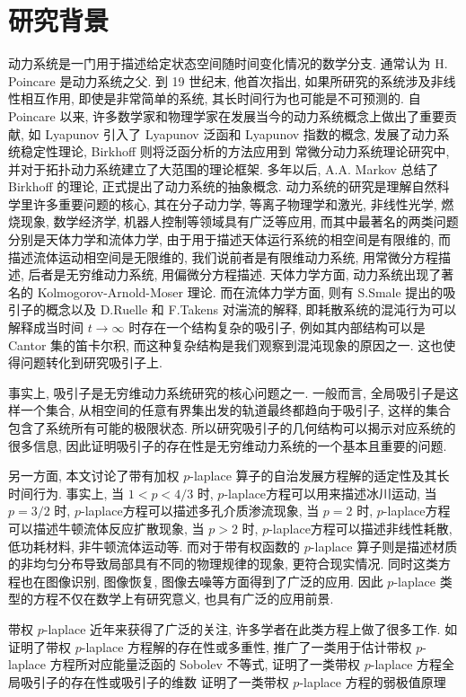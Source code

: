 \documentclass[oneside,longtitle]{LZUthesis}
\numberwithin{equation}{chapter}
\begin{document}
\section{研究背景}
动力系统是一门用于描述给定状态空间随时间变化情况的数学分支.
通常认为 H. Poincare 是动力系统之父.
到 19 世纪末, 他首次指出, 如果所研究的系统涉及非线性相互作用,
即使是非常简单的系统, 其长时间行为也可能是不可预测的.
自 Poincare 以来,
许多数学家和物理学家在发展当今的动力系统概念上做出了重要贡献,
如 Lyapunov 引入了 Lyapunov 泛函和 Lyapunov 指数的概念,
发展了动力系统稳定性理论, Birkhoff 则将泛函分析的方法应用到
常微分动力系统理论研究中, 并对于拓扑动力系统建立了大范围的理论框架.
多年以后, A.A. Markov 总结了 Birkhoff 的理论, 正式提出了动力系统的抽象概念.
动力系统的研究是理解自然科学里许多重要问题的核心,
其在分子动力学, 等离子物理学和激光, 非线性光学, 燃烧现象, 数学经济学, 机器人控制等领域具有广泛等应用,
而其中最著名的两类问题分别是天体力学和流体力学,
由于用于描述天体运行系统的相空间是有限维的, 而描述流体运动相空间是无限维的,
我们说前者是有限维动力系统, 用常微分方程描述, 后者是无穷维动力系统, 用偏微分方程描述.
天体力学方面, 动力系统出现了著名的 Kolmogorov-Arnold-Moser 理论.
而在流体力学方面, 则有 S.Smale 提出的吸引子的概念以及 D.Ruelle 和 F.Takens 对湍流的解释,
即耗散系统的混沌行为可以解释成当时间
$t \to \infty$ 时存在一个结构复杂的吸引子, 例如其内部结构可以是 Cantor 集的笛卡尔积,
而这种复杂结构是我们观察到混沌现象的原因之一. 这也使得问题转化到研究吸引子上.

事实上, 吸引子是无穷维动力系统研究的核心问题之一.
一般而言, 全局吸引子是这样一个集合, 从相空间的任意有界集出发的轨道最终都趋向于吸引子,
这样的集合包含了系统所有可能的极限状态.
所以研究吸引子的几何结构可以揭示对应系统的很多信息,
因此证明吸引子的存在性是无穷维动力系统的一个基本且重要的问题.

另一方面, 本文讨论了带有加权 $p$-laplace 算子的自治发展方程解的适定性及其长时间行为.
事实上, 当 $1 < p < 4/3$ 时, $p$-laplace方程可以用来描述冰川运动,
当 $p = 3/2$ 时, $p$-laplace方程可以描述多孔介质渗流现象,
当 $p = 2$ 时, $p$-laplace方程可以描述牛顿流体反应扩散现象,
当 $p > 2$ 时, $p$-laplace方程可以描述非线性耗散, 低功耗材料, 非牛顿流体运动等.
而对于带有权函数的 $p$-laplace 算子则是描述材质的非均匀分布导致局部具有不同的物理规律的现象,
更符合现实情况. 同时这类方程也在图像识别, 图像恢复, 图像去噪等方面得到了广泛的应用.
因此 $p$-laplace 类型的方程不仅在数学上有研究意义, 也具有广泛的应用前景.

带权 $p$-laplace 近年来获得了广泛的关注, 许多学者在此类方程上做了很多工作.
如\citep{cortazarExistenceSignChanging2014,musinaExistenceMultiplicityResults2009,cavalheiroWeightedSobolevSpaces2008,caldiroliVariationalDegenerateElliptic2000,leBoundaryValueProblems1998,yinEvolutionaryWeightedPLaplacian2007,Zhan2019Uniquenessa}证明了带权 $p$-laplace 方程解的存在性或多重性,
\citep{gazziniSobolevtypeInequalityRelated2009}推广了一类用于估计带权 $p$-laplace 方程所对应能量泛函的 Sobolev 不等式,
\citep{liLongtimeBehaviorClass2014b,maGlobalAttractorsWeighted2012a,galClassDegenerateParabolic2012}证明了一类带权 $p$-laplace 方程全局吸引子的存在性或吸引子的维数
\citep{monticelliMaximumPrinciplesWeak2009}证明了一类带权 $p$-laplace 方程的弱极值原理
\end{document}

